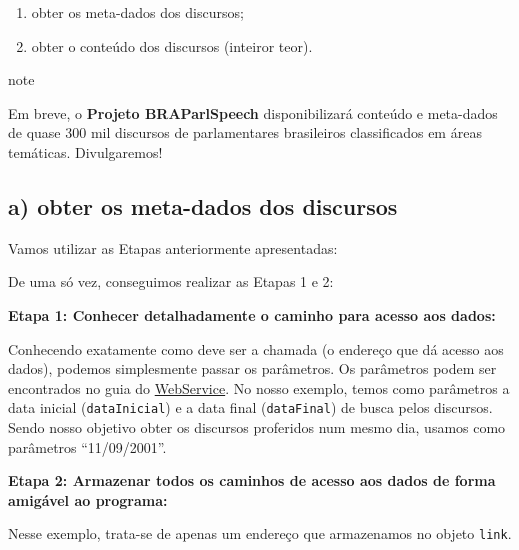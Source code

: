 \documentclass[]{book}
\providecommand{\tightlist}{%
  \setlength{\itemsep}{0pt}\setlength{\parskip}{0pt}}
\begin{document}
\begin{enumerate}
\def\labelenumi{\alph{enumi})}
\tightlist
\item
  obter os meta-dados dos discursos;
\item
  obter o conteúdo dos discursos (inteiror teor).
\end{enumerate}

\begin{infobox}note

Em breve, o \textbf{Projeto BRAParlSpeech} disponibilizará conteúdo e meta-dados de quase 300 mil
discursos de parlamentares brasileiros classificados em áreas temáticas. Divulgaremos!

\end{infobox}

\hypertarget{a-obter-os-meta-dados-dos-discursos}{%
\subsection{a) obter os meta-dados dos discursos}\label{a-obter-os-meta-dados-dos-discursos}}

Vamos utilizar as Etapas anteriormente apresentadas:

De uma só vez, conseguimos realizar as Etapas 1 e 2:

\textbf{Etapa 1: Conhecer detalhadamente o caminho para acesso aos dados:}

Conhecendo exatamente como deve ser a chamada (o endereço que dá acesso aos dados),
podemos simplesmente passar os parâmetros. Os parâmetros podem ser encontrados no guia do \href{https://www2.camara.leg.br/transparencia/dados-abertos/dados-abertos-legislativo/webservices/sessoesreunioes-2/listardiscursosplenario}{WebService}.
No nosso exemplo, temos como parâmetros a data inicial (\texttt{dataInicial}) e a data
final (\texttt{dataFinal}) de busca pelos discursos. Sendo nosso objetivo obter os
discursos proferidos num mesmo dia, usamos como parâmetros ``11/09/2001''.

\textbf{Etapa 2: Armazenar todos os caminhos de acesso aos dados de forma amigável ao programa:}

Nesse exemplo, trata-se de apenas um endereço que armazenamos no objeto \texttt{link}.
\end{document}
